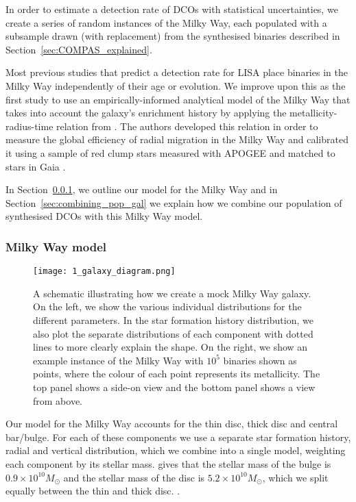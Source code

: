 In order to estimate a detection rate of DCOs with statistical uncertainties, we create a series of random instances of the Milky Way, each populated with a subsample drawn (with replacement) from the synthesised binaries described in Section~\ref{sec:COMPAS_explained}.

Most previous studies that predict a detection rate for LISA place binaries in the Milky Way independently of their age or evolution. We improve upon this as the first study to use an empirically-informed analytical model of the Milky Way that takes into account the galaxy's enrichment history by applying the metallicity-radius-time relation from \citet{Frankel+2018}. The authors developed this relation in order to measure the global efficiency of radial migration in the Milky Way and calibrated it using a sample of red clump stars measured with APOGEE \citep{Majewski+2017} and matched to stars in Gaia \citep{GaiaCollaboration+2016}.

In Section~\ref{sec:mw_model}, we outline our model for the Milky Way and in Section~\ref{sec:combining_pop_gal} we explain how we combine our population of synthesised DCOs with this Milky Way model.

\subsubsection{Milky Way model}\label{sec:mw_model}

\begin{figure*}[t]
    \centering
    \texttt{[image: 1\_galaxy\_diagram.png]}
    \caption{A schematic illustrating how we create a mock Milky Way galaxy. On the left, we show the various individual distributions for the different parameters. In the star formation history distribution, we also plot the separate distributions of each component with dotted lines to more clearly explain the shape. On the right, we show an example instance of the Milky Way with $10^5$ binaries shown as points, where the colour of each point represents its metallicity. The top panel shows a side-on view and the bottom panel shows a view from above.}
    \label{fig:galaxy_schematic}
\end{figure*}

Our model for the Milky Way accounts for the thin disc, thick disc and central bar/bulge. For each of these components we use a separate star formation history, radial and vertical distribution, which we combine into a single model, weighting each component by its stellar mass. \citet{Licquia+2015} gives that the stellar mass of the bulge is $0.9 \times 10^{10} \unit{M_{\odot}}$ and the stellar mass of the disc is $5.2 \times 10^{10} \unit{M_\odot}$, which we split equally between the thin and thick disc. .

